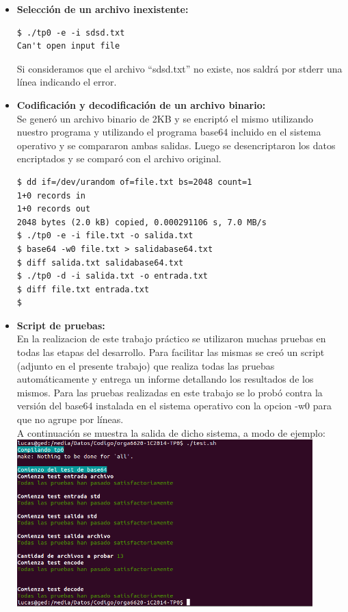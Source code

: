 \documentclass[a4paper,10pt, fleqn]{article}
\begin{document}
\begin{itemize}
      
      \item \textbf{Selección de un archivo inexistente: }\\
      \begin{verbatim}
$ ./tp0 -e -i sdsd.txt
Can't open input file
      \end{verbatim}
      Si consideramos  que el archivo ``sdsd.txt'' no existe, nos saldrá por stderr una línea indicando el error. \\

      \item \textbf{Codificación y decodificación de un archivo binario: }\\
      Se generó un archivo binario de 2KB y se encriptó el mismo utilizando nuestro programa y utilizando el programa base64 incluido en el sistema operativo y se compararon ambas salidas.
      Luego se desencriptaron los datos encriptados y se comparó con el archivo original.\\
      \begin{verbatim}
$ dd if=/dev/urandom of=file.txt bs=2048 count=1
1+0 records in
1+0 records out
2048 bytes (2.0 kB) copied, 0.000291106 s, 7.0 MB/s
$ ./tp0 -e -i file.txt -o salida.txt
$ base64 -w0 file.txt > salidabase64.txt
$ diff salida.txt salidabase64.txt
$ ./tp0 -d -i salida.txt -o entrada.txt
$ diff file.txt entrada.txt
$
      \end{verbatim}

      \item \textbf{Script de pruebas: }\\
      En la realizacion de este trabajo práctico se utilizaron muchas pruebas en todas las etapas del desarrollo.
      Para facilitar las mismas se creó un script (adjunto en el presente trabajo) que realiza todas las pruebas automáticamente y entrega un informe 
      detallando los resultados de los mismos.
Para las pruebas realizadas en este trabajo se lo probó contra la versión del base64 instalada en el sistema operativo con la opcion -w0 para que no agrupe por líneas.\\
A continuación se muestra la salida de dicho sistema, a modo de ejemplo:\\

\includegraphics[width=0.9\textwidth]{tests.png}


\end{itemize}
\end{document}
